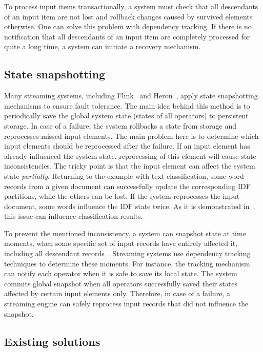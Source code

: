 To process input items transactionally, a system must check that all descendants of an input item are not lost and rollback changes caused by survived elements otherwise. One can solve this problem with dependency tracking. If there is no notification that all descendants of an input item are completely processed for quite a long time, a system can initiate a recovery mechanism.

\subsection{State snapshotting}
Many streaming systems, including Flink~\cite{Carbone:2017:SMA:3137765.3137777} and Heron~\cite{Kulkarni:2015:THS:2723372.2742788}, apply state snapshotting mechanisms to ensure fault tolerance. The main idea behind this method is to periodically save the global system state (states of all operators) to persistent storage. In case of a failure, the system rollbacks a state from storage and reprocesses missed input elements. The main problem here is to determine which input elements should be reprocessed after the failure. If an input element has already influenced the system state, reprocessing of this element will cause state inconsistencies. The tricky point is that the input element can affect the system state {\em partially}. Returning to the example with text classification, some word records from a given document can successfully update the corresponding IDF partitions, while the others can be lost. If the system reprocesses the input document, some words influence the IDF state twice. As it is demonstrated in~\cite{webirte}, this issue can influence classification results.

To prevent the mentioned inconsistency, a system can snapshot state at time moments, when some specific set of input records have entirely affected it, including all descendant records~\cite{2015arXiv150608603C, thepaper}. Streaming systems use dependency tracking techniques to determine these moments. For instance, the tracking mechanism can notify each operator when it is safe to save its local state. The system commits global snapshot when all operators successfully saved their states affected by certain input elements only. Therefore, in case of a failure, a streaming engine can safely reprocess input records that did not influence the snapshot.

\subsection{Existing solutions} \label{existing_solutions}

